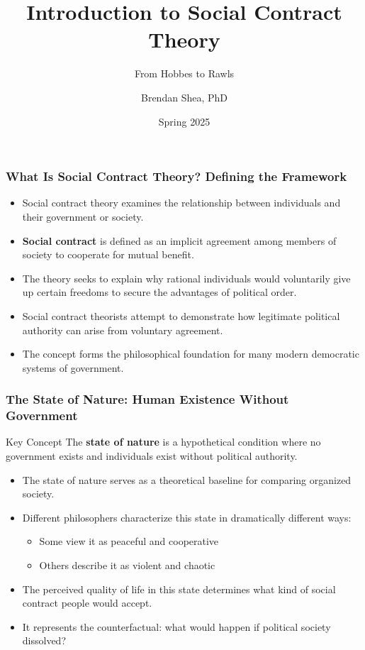 \documentclass[aspectratio=169]{beamer}
\title{Introduction to Social Contract Theory}
\subtitle{From Hobbes to Rawls}
\author{Brendan Shea, PhD}
\date{Spring 2025}
\begin{document}
\begin{frame}
  \titlepage
\end{frame}

\begin{frame}
  \frametitle{What Is Social Contract Theory? Defining the Framework}
  
  \begin{itemize}
    \item Social contract theory examines the relationship between individuals and their government or society.
    \item \textbf{Social contract} is defined as an implicit agreement among members of society to cooperate for mutual benefit.
    \item The theory seeks to explain why rational individuals would voluntarily give up certain freedoms to secure the advantages of political order.
    \item Social contract theorists attempt to demonstrate how legitimate political authority can arise from voluntary agreement.
    \item The concept forms the philosophical foundation for many modern democratic systems of government.
  \end{itemize}
\end{frame}

\begin{frame}
  \frametitle{The State of Nature: Human Existence Without Government}
  
  \begin{block}{Key Concept}
    The \textbf{state of nature} is a hypothetical condition where no government exists and individuals exist without political authority.
  \end{block}
  
  \begin{itemize}
    \item The state of nature serves as a theoretical baseline for comparing organized society.
    \item Different philosophers characterize this state in dramatically different ways:
      \begin{itemize}
        \item Some view it as peaceful and cooperative
        \item Others describe it as violent and chaotic
      \end{itemize}
    \item The perceived quality of life in this state determines what kind of social contract people would accept.
    \item It represents the counterfactual: what would happen if political society dissolved?
  \end{itemize}
\end{frame}
\end{document}
